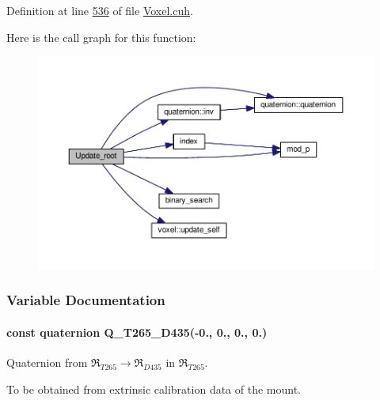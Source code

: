 Definition at line \hyperlink{Voxel_8cuh_source_l00536}{536} of file \hyperlink{Voxel_8cuh_source}{Voxel.\+cuh}.



Here is the call graph for this function\+:\nopagebreak
\begin{figure}[H]
\begin{center}
\leavevmode
\includegraphics[width=350pt]{Voxel_8cuh_a935fc0c42796b23607cf6f81a1e95e8d_cgraph}
\end{center}
\end{figure}




\subsubsection{Variable Documentation}
\paragraph[{\texorpdfstring{Q\+\_\+\+T265\+\_\+\+D435}{Q_T265_D435}}]{\setlength{\rightskip}{0pt plus 5cm}const {\bf quaternion} Q\+\_\+\+T265\+\_\+\+D435(-\/0., 0., 0., 0.)\hspace{0.3cm}{\ttfamily [static]}}\hypertarget{Voxel_8cuh_ae638036c15a578080c34013047df2c4f}{}\label{Voxel_8cuh_ae638036c15a578080c34013047df2c4f}


Quaternion from $\mathfrak{R}_{T265} \to \mathfrak{R}_{D435}$ in $\mathfrak{R}_{T265}$. 

To be obtained from extrinsic calibration data of the mount. 
